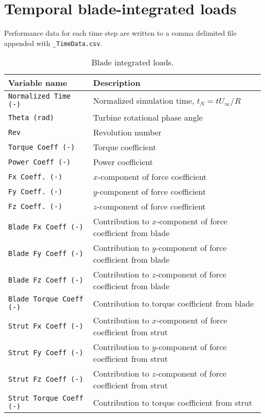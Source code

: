 \section{Temporal blade-integrated loads}
Performance data for each time step are written to a comma delimited file appended with \texttt{\_TimeData.csv}.

\begin{table}[!htbp]
\centering
\caption{Blade integrated loads.}
\label{tbl:output_vars_time}
\begin{tabular}{p{}p{}}
\toprule
Variable name & Description \\ \midrule
\texttt{Normalized Time (-)}      & Normalized simulation time, $t_N=t U_\infty/R$ \\
\texttt{Theta (rad)}              & Turbine rotational phase angle \\
\texttt{Rev}                      & Revolution number \\
\texttt{Torque Coeff (-)}         & Torque coefficient \\
\texttt{Power Coeff (-)}          & Power coefficient \\
\texttt{Fx Coeff. (-)}            & $x$-component of force coefficient \\
\texttt{Fy Coeff. (-)}            & $y$-component of force coefficient \\
\texttt{Fz Coeff. (-)}            & $z$-component of force coefficient \\
\texttt{Blade Fx Coeff (-)}       & Contribution to $x$-component of force coefficient from blade \\
\texttt{Blade Fy Coeff (-)}       & Contribution to $y$-component of force coefficient from blade \\
\texttt{Blade Fz Coeff (-)}       & Contribution to $z$-component of force coefficient from blade \\
\texttt{Blade Torque Coeff (-)}   & Contribution to torque coefficient from blade \\
\texttt{Strut Fx Coeff (-)}       & Contribution to $x$-component of force coefficient from strut \\
\texttt{Strut Fy Coeff (-)}       & Contribution to $y$-component of force coefficient from strut \\
\texttt{Strut Fz Coeff (-)}       & Contribution to $z$-component of force coefficient from strut \\
\texttt{Strut Torque Coeff (-)}   & Contribution to torque coefficient from strut \\
\bottomrule
\end{tabular}
\end{table}

